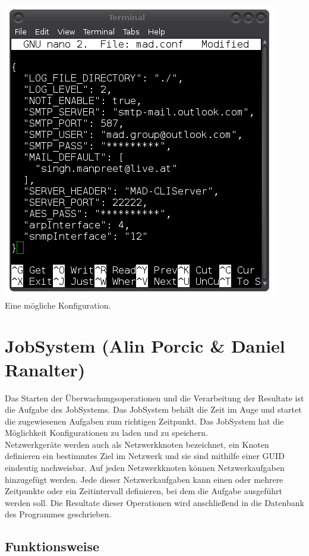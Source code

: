 \documentclass[12pt,a4paper]{report}
\begin{document}
\begin{onehalfspace}
\begin{center}
\includegraphics[scale=0.6]{img/madconf.png}\\
Eine mögliche Konfiguration.
\end{center}

\chapter{JobSystem (Alin Porcic \& Daniel Ranalter)}

Das Starten der Überwachungsoperationen und die Verarbeitung der Resultate ist die Aufgabe des JobSystems. Das JobSystem behält die Zeit im Auge und startet die zugewiesenen Aufgaben zum richtigen Zeitpunkt. Das JobSystem hat die Möglichkeit Konfigurationen zu laden und zu speichern.\\
Netzwerkgeräte werden auch als Netzwerkknoten bezeichnet, ein Knoten definieren ein bestimmtes Ziel im Netzwerk und sie sind mithilfe einer GUID eindeutig nachweisbar. Auf jeden Netzwerkknoten können Netzwerkaufgaben hinzugefügt werden. Jede dieser Netzwerkaufgaben kann einen oder mehrere Zeitpunkte oder ein Zeitintervall definieren, bei dem die Aufgabe ausgeführt werden soll. Die Resultate dieser Operationen wird anschließend in die Datenbank des Programmes geschrieben.

\section{Funktionsweise}


\end{onehalfspace}
\end{document}
